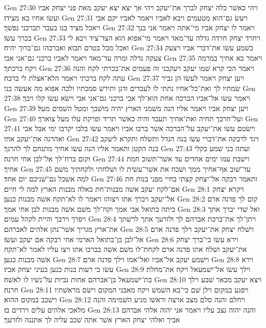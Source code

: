 Gen 27:30  ויהי כאשׁר כלה יצחק לברך את־יעקב ויהי אך יצא יצא יעקב מאת פני יצחק אביו ועשׂו אחיו בא מצידו׃
Gen 27:31  ויעשׂ גם־הוא מטעמים ויבא לאביו ויאמר לאביו יקם אבי ויאכל מציד בנו בעבר תברכני נפשׁך׃
Gen 27:32  ויאמר לו יצחק אביו מי־אתה ויאמר אני בנך בכרך עשׂו׃
Gen 27:33  ויחרד יצחק חרדה גדלה עד־מאד ויאמר מי־אפוא הוא הצד־ציד ויבא לי ואכל מכל בטרם תבוא ואברכהו גם־ברוך יהיה׃
Gen 27:34  כשׁמע עשׂו את־דברי אביו ויצעק צעקה גדלה ומרה עד־מאד ויאמר לאביו ברכני גם־אני אבי׃
Gen 27:35  ויאמר בא אחיך במרמה ויקח ברכתך׃
Gen 27:36  ויאמר הכי קרא שׁמו יעקב ויעקבני זה פעמים את־בכרתי לקח והנה עתה לקח ברכתי ויאמר הלא־אצלת לי ברכה׃
Gen 27:37  ויען יצחק ויאמר לעשׂו הן גביר שׂמתיו לך ואת־כל־אחיו נתתי לו לעבדים ודגן ותירשׁ סמכתיו ולכה אפוא מה אעשׂה בני׃
Gen 27:38  ויאמר עשׂו אל־אביו הברכה אחת הוא־לך אבי ברכני גם־אני אבי וישׂא עשׂו קלו ויבך׃
Gen 27:39  ויען יצחק אביו ויאמר אליו הנה משׁמני הארץ יהיה מושׁבך ומטל השׁמים מעל׃
Gen 27:40  ועל־חרבך תחיה ואת־אחיך תעבד והיה כאשׁר תריד ופרקת עלו מעל צוארך׃
Gen 27:41  וישׂטם עשׂו את־יעקב על־הברכה אשׁר ברכו אביו ויאמר עשׂו בלבו יקרבו ימי אבל אבי ואהרגה את־יעקב אחי׃
Gen 27:42  ויגד לרבקה את־דברי עשׂו בנה הגדל ותשׁלח ותקרא ליעקב בנה הקטן ותאמר אליו הנה עשׂו אחיך מתנחם לך להרגך׃
Gen 27:43  ועתה בני שׁמע בקלי וקום ברח־לך אל־לבן אחי חרנה׃
Gen 27:44  וישׁבת עמו ימים אחדים עד אשׁר־תשׁוב חמת אחיך׃
Gen 27:45  עד־שׁוב אף־אחיך ממך ושׁכח את אשׁר־עשׂית לו ושׁלחתי ולקחתיך משׁם למה אשׁכל גם־שׁניכם יום אחד׃
Gen 27:46  ותאמר רבקה אל־יצחק קצתי בחיי מפני בנות חת אם־לקח יעקב אשׁה מבנות־חת כאלה מבנות הארץ למה לי חיים׃
Gen 28:1  ויקרא יצחק אל־יעקב ויברך אתו ויצוהו ויאמר לו לא־תקח אשׁה מבנות כנען׃
Gen 28:2  קום לך פדנה ארם ביתה בתואל אבי אמך וקח־לך משׁם אשׁה מבנות לבן אחי אמך׃
Gen 28:3  ואל שׁדי יברך אתך ויפרך וירבך והיית לקהל עמים׃
Gen 28:4  ויתן־לך את־ברכת אברהם לך ולזרעך אתך לרשׁתך את־ארץ מגריך אשׁר־נתן אלהים לאברהם׃
Gen 28:5  וישׁלח יצחק את־יעקב וילך פדנה ארם אל־לבן בן־בתואל הארמי אחי רבקה אם יעקב ועשׂו׃
Gen 28:6  וירא עשׂו כי־ברך יצחק את־יעקב ושׁלח אתו פדנה ארם לקחת־לו משׁם אשׁה בברכו אתו ויצו עליו לאמר לא־תקח אשׁה מבנות כנען׃
Gen 28:7  וישׁמע יעקב אל־אביו ואל־אמו וילך פדנה ארם׃
Gen 28:8  וירא עשׂו כי רעות בנות כנען בעיני יצחק אביו׃
Gen 28:9  וילך עשׂו אל־ישׁמעאל ויקח את־מחלת בת־ישׁמעאל בן־אברהם אחות נביות על־נשׁיו לו לאשׁה׃
Gen 28:10  ויצא יעקב מבאר שׁבע וילך חרנה׃
Gen 28:11  ויפגע במקום וילן שׁם כי־בא השׁמשׁ ויקח מאבני המקום וישׂם מראשׁתיו וישׁכב במקום ההוא׃
Gen 28:12  ויחלם והנה סלם מצב ארצה וראשׁו מגיע השׁמימה והנה מלאכי אלהים עלים וירדים בו׃
Gen 28:13  והנה יהוה נצב עליו ויאמר אני יהוה אלהי אברהם אביך ואלהי יצחק הארץ אשׁר אתה שׁכב עליה לך אתננה ולזרעך׃
